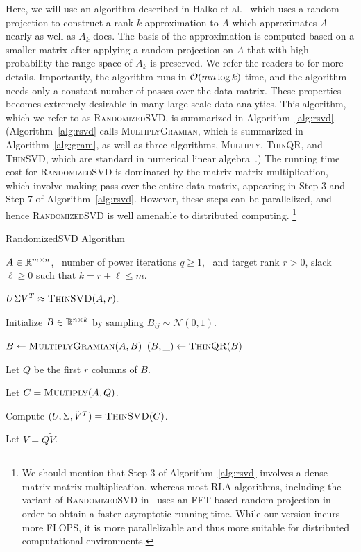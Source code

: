 Here, we will use an algorithm described in Halko et al.~\cite{HMT09_SIREV} which uses a random projection to construct a rank-$k$ approximation to $A$ which approximates $A$ nearly as well as $A_k$ does.
The basis of the approximation is computed based on a smaller matrix after applying a random projection on $A$ that with high probability the range space of $A_k$ is preserved. We refer the readers to \cite{HMT09_SIREV,Mah-mat-rev_BOOK} for more details.
Importantly, the algorithm runs in $\operatorname{\mathcal{O}}(mn \log k)$ time, and the algorithm needs only a constant number of passes over the data matrix. 
These properties becomes extremely desirable in many large-scale data analytics. 
This algorithm, which we refer to as \textsc{RandomizedSVD}, is summarized in Algorithm~\ref{alg:rsvd}.
(Algorithm~\ref{alg:rsvd} calls \textsc{MultiplyGramian}, which is summarized in Algorithm~\ref{alg:gram}, as well as three algorithms, \textsc{Multiply}, \textsc{ThinQR}, and \textsc{ThinSVD}, which are standard in numerical linear algebra~\cite{GVL96}.) 
The running time cost for \textsc{RandomizedSVD} is dominated by the matrix-matrix multiplication, which involve making pass over the entire data matrix, appearing in Step 3 and Step 7 of Algorithm~\ref{alg:rsvd}.
However, these steps can be parallelized, and hence \textsc{RandomizedSVD} is well amenable to distributed computing.%
\footnote{We should mention that Step 3 of Algorithm~\ref{alg:rsvd} involves a dense matrix-matrix multiplication, whereas most RLA algorithms, including the variant of \textsc{RandomizedSVD} in~\cite{HMT09_SIREV} uses an FFT-based random projection in order to obtain a faster asymptotic running time.  While our version incurs more FLOPS, it is more parallelizable and thus more suitable for distributed computational environments.}


\begin{algorithm}[tb]
 \caption{{\sc RandomizedSVD} Algorithm}
  \label{alg:rsvd}
  \begin{algorithmic}[1]
    \Require $A \in \mathbb{R}^{m\times n}$, \
      number of power iterations $q \ge 1$, \
      and target rank $r > 0$, slack $\ell \ge 0$ such that $k=r+\ell \leq m$.

    \Ensure $U \Sigma V^T \approx \Call{ThinSVD}{A, r}$.

    \State Initialize $B \in \mathbb{R}^{n\times k}$ by sampling $B_{ij} \sim \mathcal{N}(0, 1)$.

    \For{$q$ times}
        \State $B \gets \Call{MultiplyGramian}{A, B}$
        \State $(B, \_) \gets \Call{ThinQR}{B}$
    \EndFor

    \State Let $Q$ be the first $r$ columns of $B$.

    \State Let $C = \Call{Multiply}{A, Q}$.

    \State Compute $(U, \Sigma, \tilde V^T) = \Call{ThinSVD}{C}$.

    \State Let $V = Q \tilde V$.

    \end{algorithmic}
\end{algorithm}

